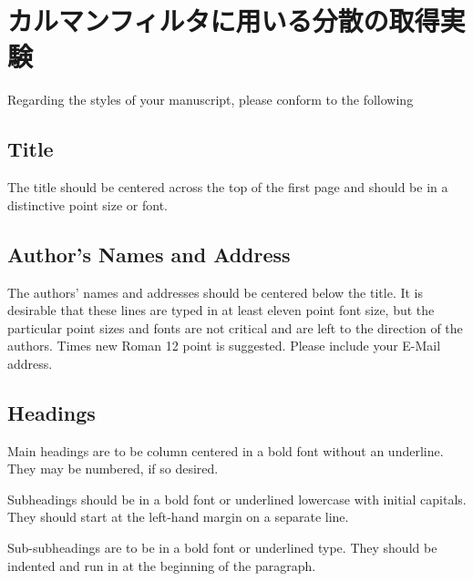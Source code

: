 \documentclass[a4paper]{article}
\begin{document}

\section{カルマンフィルタに用いる分散の取得実験}

Regarding the styles of your manuscript, please conform to the following 

\subsection{Title}
The title should be centered across the top of the first page and should 
be in a distinctive point size or font.

\subsection{Author's Names and Address}
The authors' names and addresses should be centered below the title.
It is desirable that these lines are typed in at least eleven point font size,
but the particular point sizes and fonts are not critical and are left to the
direction of the authors.
Times new Roman 12 point is suggested.
Please include your E-Mail address. 

\subsection{Headings}
Main headings are to be column centered in a bold font without an underline.
They may be numbered, if so desired. 

Subheadings should be in a bold font or underlined lowercase with initial
capitals.
They should start at the left-hand margin on a separate line.

Sub-subheadings are to be in a bold font or underlined type.
They should be indented and run in at the beginning of the paragraph.
\end{document}

